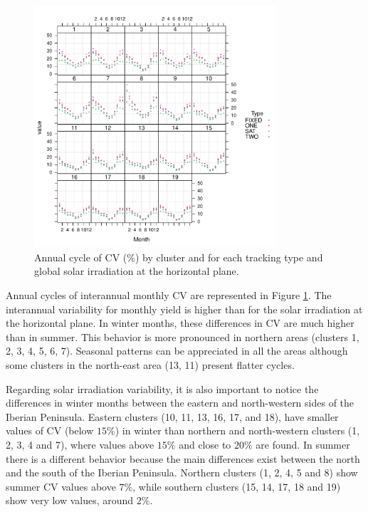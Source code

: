 \begin{figure}
\includegraphics[width=0.8\textwidth]{figs/capitulo5/ciclo_anual_byCluster_all2}
\caption[Annual cycle of CV by cluster and tracking type over the Iberian Peninsula]{Annual cycle of CV ($\%$) by cluster and for each tracking type and global solar irradiation at the horizontal plane.}
\label{cicloAnualCV_all}
\end{figure}

Annual cycles of interannual monthly CV are represented in Figure \ref{cicloAnualCV_all}. The interannual variability for monthly yield is higher than for the solar irradiation at the horizontal plane. In winter months, these differences in CV are much higher than in summer. This behavior is more pronounced in northern areas (clusters 1, 2, 3, 4, 5, 6, 7).  Seasonal patterns can be appreciated in all the areas although some clusters in the north-east area (13, 11) present flatter cycles.

Regarding solar irradiation variability, it is also important to notice the differences in winter months between the eastern and north-western sides of the Iberian Peninsula. Eastern clusters (10, 11, 13, 16, 17, and 18), have smaller values of CV (below $15\%$) in winter than northern and north-western clusters (1, 2, 3, 4 and 7), where values above $15\%$ and close to $20\%$ are found. In summer there is a different behavior because the main differences exist between the north and the south of the Iberian Peninsula. Northern clusters (1, 2, 4, 5 and 8) show summer CV values above $7\%$, while southern clusters (15, 14, 17, 18 and 19) show very low values, around $2\%$.


